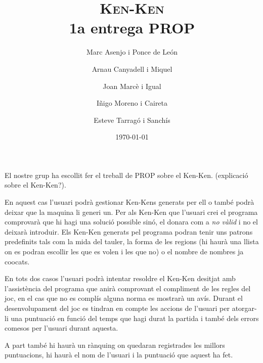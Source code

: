 \documentclass[a4paper,12pt]{article}
\begin{document}
\title{\textsc{Ken-Ken} \\ \large 1a entrega PROP}
\author{Marc Asenjo i Ponce de León \and
	Arnau Canyadell i Miquel \and
	Joan Marcè i Igual \and
	Iñigo Moreno i Caireta \and
	Esteve Tarragó i Sanchís}

\date{\today}
\maketitle

El nostre grup ha escollit fer el treball de PROP sobre el Ken-Ken. (explicació
sobre el Ken-Ken?). 

En aquest cas l'usuari podrà gestionar Ken-Kens generats per ell o també podrà
deixar que la maquina li generi un. 
Per als Ken-Ken que l'usuari crei el programa comprovarà que hi hagi una solució
possible sinó, el donara com a \emph{no vàlid} i no el deixarà introduir. Els Ken-Ken generats 
pel programa podran tenir uns patrons predefinits tals com la mida del tauler, la forma de les 
regions (hi haurà una llista on es podran escollir les que es volen i les que no) o el nombre 
de nombres ja co\lgem ocats.

En tots dos casos l'usuari podrà intentar resoldre el Ken-Ken desitjat amb
l'assistència del programa que anirà comprovant el compliment de les regles del
joc, en el cas que no es complís alguna norma es mostrarà un avís. Durant el
desenvolupament del joc es tindran en compte les accions de l'usuari per
atorgar-li una puntuació en funció del temps que hagi durat la partida
i també dels errors comesos per l'usuari durant aquesta.

A part també hi haurà un rànquing on quedaran registrades les millors puntuacions,
hi haurà el nom de l'usuari i la puntuació que aquest ha fet.

\vspace{2cm}
\end{document}
